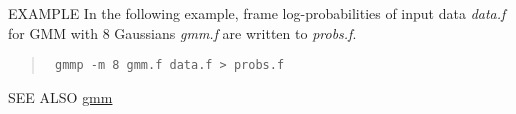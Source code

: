\begin{qsection}{EXAMPLE}
In the following example, frame log-probabilities of input data {\em
data.f} for GMM with 8 Gaussians {\em gmm.f} are written to {\em
probs.f}.

\begin{quote}
\verb! gmmp -m 8 gmm.f data.f > probs.f!
\end{quote}
\end{qsection}

\begin{qsection}{SEE ALSO}
\hyperlink{gmm}{gmm}
\end{qsection}
